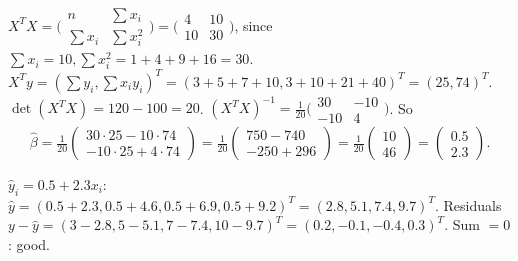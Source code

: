 \begin{solutions}
  \item $X^{T} X = \bigl(\begin{smallmatrix} n & \sum x_{i} \\ \sum x_{i} & \sum x_{i}^{2} \end{smallmatrix}\bigr) = \bigl(\begin{smallmatrix} 4 & 10 \\ 10 & 30 \end{smallmatrix}\bigr)$,
        since $\sum x_{i} = 10, \sum x_{i}^{2} = 1 + 4 + 9 + 16 = 30$.
        $X^{T} y = (\sum y_{i}, \sum x_{i} y_{i})^{T} = (3 + 5 + 7 + 10, 3 + 10 + 21 + 40)^{T} = (25, 74)^{T}$.
        $\det(X^{T} X) = 120 - 100 = 20$.
        $(X^{T} X)^{-1} = \tfrac{1}{20}\bigl(\begin{smallmatrix} 30 & -10 \\ -10 & 4 \end{smallmatrix}\bigr)$.
        So
        \[
        \hat{\beta} = \tfrac{1}{20}\begin{pmatrix} 30 \cdot 25 - 10 \cdot 74 \\ -10 \cdot 25 + 4 \cdot 74 \end{pmatrix} = \tfrac{1}{20}\begin{pmatrix} 750 - 740 \\ -250 + 296 \end{pmatrix} = \tfrac{1}{20}\begin{pmatrix} 10 \\ 46 \end{pmatrix} = \begin{pmatrix} 0.5 \\ 2.3 \end{pmatrix}.
        \]

  \item $\hat{y}_{i} = 0.5 + 2.3 x_{i}$:
        $\hat{y} = (0.5 + 2.3, 0.5 + 4.6, 0.5 + 6.9, 0.5 + 9.2)^{T} = (2.8, 5.1, 7.4, 9.7)^{T}$.
        Residuals
        $y - \hat{y} = (3 - 2.8, 5 - 5.1, 7 - 7.4, 10 - 9.7)^{T} = (0.2, -0.1, -0.4, 0.3)^{T}$.
        Sum $= 0$: good.


\end{solutions}
